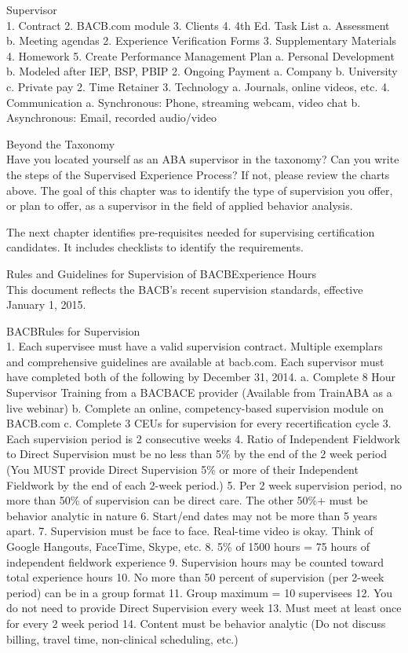 Supervisor\\
    1. Contract
    2. BACB.com module
    3. Clients
    4. 4th Ed. Task List
        a. Assessment
        b. Meeting agendas
    2. Experience Verification Forms
    3. Supplementary Materials
    4. Homework
    5. Create Performance Management Plan
        a. Personal Development
        b. Modeled after IEP, BSP, PBIP
    2. Ongoing Payment
        a. Company
        b. University
        c. Private pay
    2. Time Retainer
    3. Technology
        a. Journals, online videos, etc.
    4. Communication
        a. Synchronous: Phone, streaming webcam, video chat
        b. Asynchronous: Email, recorded audio/video

Beyond the Taxonomy\\
Have you located yourself as an ABA supervisor in the taxonomy? Can you write the steps of the Supervised Experience Process? If not, please review the charts above. The goal of this chapter was to identify the type of supervision you offer, or plan to offer, as a supervisor in the field of applied behavior analysis.

The next chapter identifies pre-requisites needed for supervising certification candidates. It includes checklists to identify the requirements.


Rules and Guidelines for Supervision of BACB\textregistered Experience Hours\\
This document reflects the BACB\textregistered's recent supervision standards, effective January 1, 2015.

BACB\textregistered Rules for Supervision\\
    1. Each supervisee must have a valid supervision contract. Multiple exemplars and comprehensive guidelines are available at bacb.com. Each supervisor must have completed both of the following by December 31, 2014.
        a. Complete 8 Hour Supervisor Training from a BACB\textregistered ACE provider (Available from TrainABA as a live webinar)
        b. Complete an online, competency-based supervision module on BACB.com
        c. Complete 3 CEUs for supervision for every recertification cycle
    3. Each supervision period is 2 consecutive weeks
    4. Ratio of Independent Fieldwork to Direct Supervision must be no less than 5\% by the end of the 2 week period (You MUST provide Direct Supervision 5\% or more of their Independent Fieldwork by the end of each 2-week period.)
    5. Per 2 week supervision period, no more than 50\% of supervision can be direct care. The other 50\%+ must be behavior analytic in nature
    6. Start/end dates may not be more than 5 years apart.
    7. Supervision must be face to face. Real-time video is okay. Think of Google Hangouts, FaceTime, Skype, etc.
    8. 5\% of 1500 hours = 75 hours of independent fieldwork experience
    9. Supervision hours may be counted toward total experience hours
    10. No more than 50 percent of supervision (per 2-week period) can be in a group format
    11. Group maximum = 10 supervisees
    12. You do not need to provide Direct Supervision every week
    13. Must meet at least once for every 2 week period
    14. Content must be behavior analytic (Do not discuss billing, travel time, non-clinical scheduling, etc.)
    
